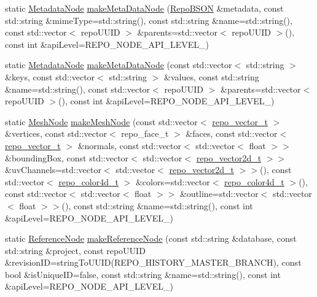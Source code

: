 \begin{DoxyCompactItemize}
\item 
static \hyperlink{classrepo_1_1core_1_1model_1_1_metadata_node}{Metadata\+Node} \hyperlink{classrepo_1_1core_1_1model_1_1_repo_b_s_o_n_factory_ad9f35349bdd78f2875797b86e372ffbd}{make\+Meta\+Data\+Node} (\hyperlink{classrepo_1_1core_1_1model_1_1_repo_b_s_o_n}{Repo\+B\+S\+O\+N} \&metadata, const std\+::string \&mime\+Type=std\+::string(), const std\+::string \&name=std\+::string(), const std\+::vector$<$ repo\+U\+U\+I\+D $>$ \&parents=std\+::vector$<$ repo\+U\+U\+I\+D $>$(), const int \&api\+Level=R\+E\+P\+O\+\_\+\+N\+O\+D\+E\+\_\+\+A\+P\+I\+\_\+\+L\+E\+V\+E\+L\+\_)
\item 
static \hyperlink{classrepo_1_1core_1_1model_1_1_metadata_node}{Metadata\+Node} \hyperlink{classrepo_1_1core_1_1model_1_1_repo_b_s_o_n_factory_a3ab71e1eae99cd29785ad50cd02e7d19}{make\+Meta\+Data\+Node} (const std\+::vector$<$ std\+::string $>$ \&keys, const std\+::vector$<$ std\+::string $>$ \&values, const std\+::string \&name=std\+::string(), const std\+::vector$<$ repo\+U\+U\+I\+D $>$ \&parents=std\+::vector$<$ repo\+U\+U\+I\+D $>$(), const int \&api\+Level=R\+E\+P\+O\+\_\+\+N\+O\+D\+E\+\_\+\+A\+P\+I\+\_\+\+L\+E\+V\+E\+L\+\_)
\item 
static \hyperlink{classrepo_1_1core_1_1model_1_1_mesh_node}{Mesh\+Node} \hyperlink{classrepo_1_1core_1_1model_1_1_repo_b_s_o_n_factory_a27372207255a35ee815109843fb21543}{make\+Mesh\+Node} (const std\+::vector$<$ \hyperlink{structrepo__vector__t}{repo\+\_\+vector\+\_\+t} $>$ \&vertices, const std\+::vector$<$ repo\+\_\+face\+\_\+t $>$ \&faces, const std\+::vector$<$ \hyperlink{structrepo__vector__t}{repo\+\_\+vector\+\_\+t} $>$ \&normals, const std\+::vector$<$ std\+::vector$<$ float $>$$>$ \&bounding\+Box, const std\+::vector$<$ std\+::vector$<$ \hyperlink{structrepo__vector2d__t}{repo\+\_\+vector2d\+\_\+t} $>$$>$ \&uv\+Channels=std\+::vector$<$ std\+::vector$<$ \hyperlink{structrepo__vector2d__t}{repo\+\_\+vector2d\+\_\+t} $>$$>$(), const std\+::vector$<$ \hyperlink{structrepo__color4d__t}{repo\+\_\+color4d\+\_\+t} $>$ \&colors=std\+::vector$<$ \hyperlink{structrepo__color4d__t}{repo\+\_\+color4d\+\_\+t} $>$(), const std\+::vector$<$ std\+::vector$<$ float $>$$>$ \&outline=std\+::vector$<$ std\+::vector$<$ float $>$$>$(), const std\+::string \&name=std\+::string(), const int \&api\+Level=R\+E\+P\+O\+\_\+\+N\+O\+D\+E\+\_\+\+A\+P\+I\+\_\+\+L\+E\+V\+E\+L\+\_)
\item 
static \hyperlink{classrepo_1_1core_1_1model_1_1_reference_node}{Reference\+Node} \hyperlink{classrepo_1_1core_1_1model_1_1_repo_b_s_o_n_factory_a788b309527ef6b00fba0ba8531e1f481}{make\+Reference\+Node} (const std\+::string \&database, const std\+::string \&project, const repo\+U\+U\+I\+D \&revision\+I\+D=string\+To\+U\+U\+I\+D(R\+E\+P\+O\+\_\+\+H\+I\+S\+T\+O\+R\+Y\+\_\+\+M\+A\+S\+T\+E\+R\+\_\+\+B\+R\+A\+N\+C\+H), const bool \&is\+Unique\+I\+D=false, const std\+::string \&name=std\+::string(), const int \&api\+Level=R\+E\+P\+O\+\_\+\+N\+O\+D\+E\+\_\+\+A\+P\+I\+\_\+\+L\+E\+V\+E\+L\+\_)
$$
\end{DoxyCompactItemize}
